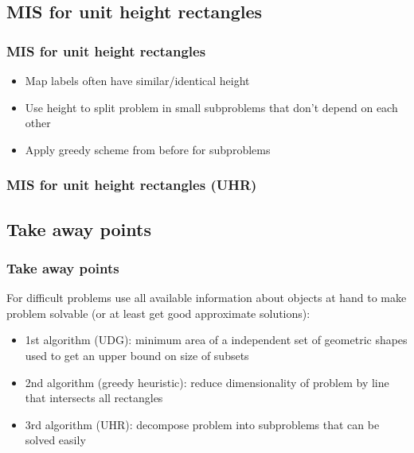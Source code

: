 \documentclass{beamer}
\begin{document}
\subsection{MIS for unit height rectangles}
\begin{frame}
\frametitle{MIS for unit height rectangles \cite{agarwallabel}}
\begin{itemize}[<+->]
\item Map labels often have similar/identical height
\item Use height to split problem in small subproblems that don't depend on each other
\item Apply greedy scheme from before for subproblems
\end{itemize}
\end{frame}

\begin{frame}
\frametitle{MIS for unit height rectangles (UHR)}
\end{frame}


\subsection{Take away points}
\begin{frame}
\frametitle{Take away points}
For difficult problems use all available information about objects at hand to make problem solvable (or at least get good approximate solutions):
\begin{itemize}
\item 1st algorithm (UDG): minimum area of a independent set of geometric shapes used to get an upper bound on size of subsets 
\item 2nd algorithm (greedy heuristic): reduce dimensionality of problem by line that intersects all rectangles
\item 3rd algorithm (UHR): decompose problem into subproblems that can be solved easily
\end{itemize}

\end{frame}
\end{document}
